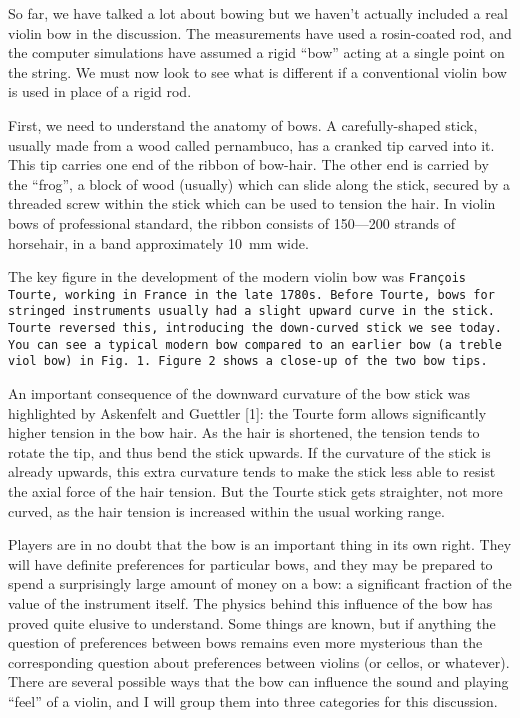 

  So far, we have talked a lot about bowing but we haven’t actually included a 
  real violin bow in the discussion. The measurements have used a rosin-coated 
  rod, and the computer simulations have assumed a rigid “bow” acting at a 
  single point on the string. We must now look to see what is different if a 
  conventional violin bow is used in place of a rigid rod. 

  First, we need to understand the anatomy of bows. A carefully-shaped stick, 
  usually made from a wood called pernambuco, has a cranked tip carved into it. 
  This tip carries one end of the ribbon of bow-hair. The other end is carried 
  by the “frog”, a block of wood (usually) which can slide along the stick, 
  secured by a threaded screw within the stick which can be used to tension the 
  hair. In violin bows of professional standard, the ribbon consists of 150—200 
  strands of horsehair, in a band approximately 10~mm wide. 

  The key figure in the development of the modern violin bow was \tt{}François 
  Tourte\rm{}, working in France in the late 1780s. Before Tourte, bows for 
  stringed instruments usually had a slight upward curve in the stick. Tourte 
  reversed this, introducing the down-curved stick we see today. You can see a 
  typical modern bow compared to an earlier bow (a treble viol bow) in Fig.\ 1. 
  Figure 2 shows a close-up of the two bow tips. 



  An important consequence of the downward curvature of the bow stick was 
  highlighted by Askenfelt and Guettler [1]: the Tourte form allows 
  significantly higher tension in the bow hair. As the hair is shortened, the 
  tension tends to rotate the tip, and thus bend the stick upwards. If the 
  curvature of the stick is already upwards, this extra curvature tends to make 
  the stick less able to resist the axial force of the hair tension. But the 
  Tourte stick gets straighter, not more curved, as the hair tension is 
  increased within the usual working range. 

  Players are in no doubt that the bow is an important thing in its own right. 
  They will have definite preferences for particular bows, and they may be 
  prepared to spend a surprisingly large amount of money on a bow: a 
  significant fraction of the value of the instrument itself. The physics 
  behind this influence of the bow has proved quite elusive to understand. Some 
  things are known, but if anything the question of preferences between bows 
  remains even more mysterious than the corresponding question about 
  preferences between violins (or cellos, or whatever). There are several 
  possible ways that the bow can influence the sound and playing “feel” of a 
  violin, and I will group them into three categories for this discussion. 

